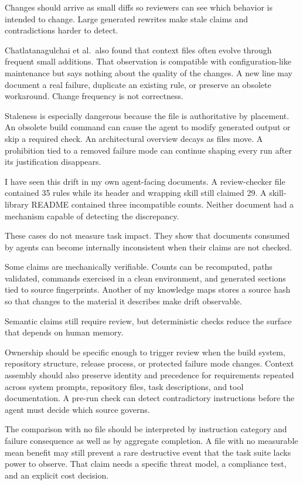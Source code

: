 Changes should arrive as small diffs so reviewers can see which behavior is intended to change. Large generated rewrites make stale claims and contradictions harder to detect.

Chatlatanagulchai et al.~also found that context files often evolve through frequent small additions. That observation is compatible with configuration-like maintenance but says nothing about the quality of the changes. A new line may document a real failure, duplicate an existing rule, or preserve an obsolete workaround. Change frequency is not correctness.

Staleness is especially dangerous because the file is authoritative by placement. An obsolete build command can cause the agent to modify generated output or skip a required check. An architectural overview decays as files move. A prohibition tied to a removed failure mode can continue shaping every run after its justification disappears.

I have seen this drift in my own agent-facing documents. A review-checker file contained 35 rules while its header and wrapping skill still claimed 29. A skill-library README contained three incompatible counts. Neither document had a mechanism capable of detecting the discrepancy.

These cases do not measure task impact. They show that documents consumed by agents can become internally inconsistent when their claims are not checked.

Some claims are mechanically verifiable. Counts can be recomputed, paths validated, commands exercised in a clean environment, and generated sections tied to source fingerprints. Another of my knowledge maps stores a source hash so that changes to the material it describes make drift observable.

Semantic claims still require review, but deterministic checks reduce the surface that depends on human memory.

Ownership should be specific enough to trigger review when the build system, repository structure, release process, or protected failure mode changes. Context assembly should also preserve identity and precedence for requirements repeated across system prompts, repository files, task descriptions, and tool documentation. A pre-run check can detect contradictory instructions before the agent must decide which source governs.

The comparison with no file should be interpreted by instruction category and failure consequence as well as by aggregate completion. A file with no measurable mean benefit may still prevent a rare destructive event that the task suite lacks power to observe. That claim needs a specific threat model, a compliance test, and an explicit cost decision.

